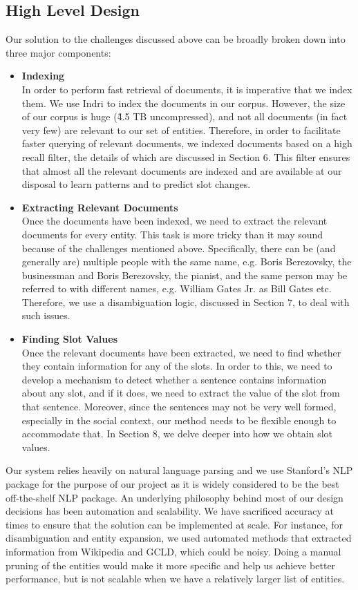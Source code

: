 \subsection{High Level Design}
Our solution to the challenges discussed above can be broadly broken down into three major components:
\begin{itemize}[label={}]
\item \textbf{Indexing} \\
In order to perform fast retrieval of documents, it is imperative that we index them. We use Indri to index the documents in our corpus. However, the size of our corpus is huge (\~4.5 TB uncompressed), and not all documents (in fact very few) are relevant to our set of entities. Therefore, in order to facilitate faster querying of relevant documents, we indexed documents based on a high recall filter, the details of which are discussed in Section 6. This filter ensures that almost all the relevant documents are indexed and are available at our disposal to learn patterns and to predict slot changes.
\item \textbf{Extracting Relevant Documents} \\
Once the documents have been indexed, we need to extract the relevant documents for every entity. This task is more tricky than it may sound because of the challenges mentioned above. Specifically, there can be (and generally are) multiple people with the same name, e.g. Boris Berezovsky, the businessman and Boris Berezovsky, the pianist, and the same person may be referred to with different names, e.g. William Gates Jr. as Bill Gates etc. Therefore, we use a disambiguation logic, discussed in Section 7, to deal with such issues.
\item \textbf{Finding Slot Values} \\
Once the relevant documents have been extracted, we need to find whether they contain information for any of the slots. In order to this, we need to develop a mechanism to detect whether a sentence contains information about any slot, and if it does, we need to extract the value of the slot from that sentence. Moreover, since the sentences may not be very well formed, especially in the social context, our method needs to be flexible enough to accommodate that. In Section 8, we delve deeper into how we obtain slot values. 
\end{itemize}
Our system relies heavily on natural language parsing and we use Stanford’s NLP package for the purpose of our project as it is widely considered to be the best off-the-shelf NLP package. An underlying philosophy behind most of our design decisions has been automation and scalability. We have sacrificed accuracy at times to ensure that the solution can be implemented at scale. For instance, for disambiguation and entity expansion, we used automated methods that extracted information from Wikipedia and GCLD, which could be noisy. Doing a manual pruning of the entities would make it more specific and help us achieve better performance, but is not scalable when we have a relatively larger list of entities.
